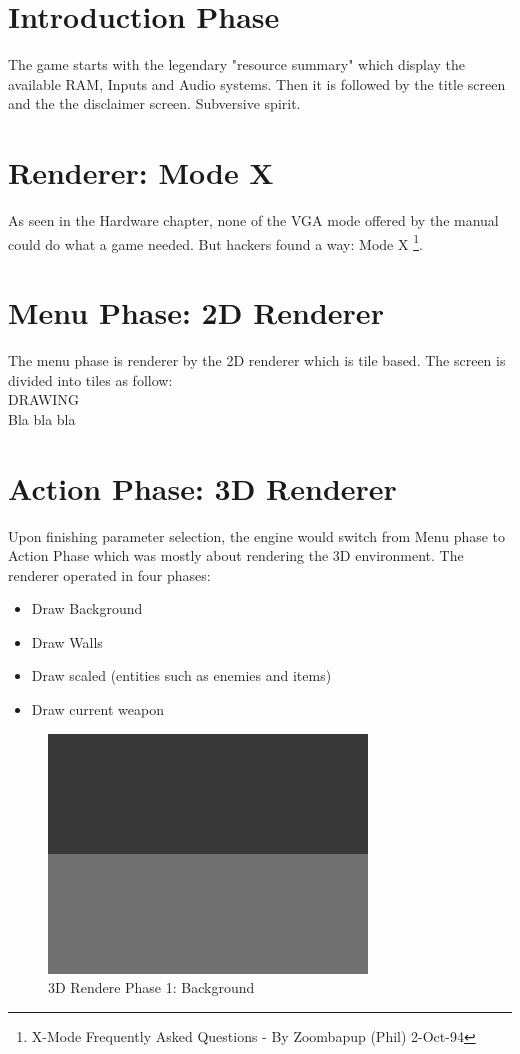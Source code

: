 \documentclass[book.tex]{subfiles}
\begin{document}
\section{Introduction Phase}
The game starts with the legendary "resource summary" which display the available RAM, Inputs and Audio systems. Then it is followed by the title screen and the the disclaimer screen. Subversive spirit.

\section{Renderer: Mode X}
As seen in the Hardware chapter, none of the VGA mode offered by the manual could do what a game needed. But hackers found
a way: Mode X \footnote{X-Mode Frequently Asked Questions - By Zoombapup (Phil)  2-Oct-94}.

\section{Menu Phase: 2D Renderer}
The menu phase is renderer by the 2D renderer which is tile based. The screen is divided into tiles as follow:\\
DRAWING\\
Bla bla bla\\

\section{Action Phase: 3D Renderer}

Upon finishing parameter selection, the engine would switch from Menu phase to Action Phase which was mostly about rendering the 3D environment. The renderer operated in four phases:
\begin{itemize}
   \item Draw Background
   \item Draw Walls
   \item Draw scaled (entities such as enemies and items)
   \item Draw current weapon
\end{itemize}
\begin{figure}[H]
\centering
 \includegraphics[scale=1.3]{screenshots/wolf3d_1_background.png}
 \caption{3D Rendere Phase 1: Background} \label{fig:mips}
 \end{figure}
\end{document}
